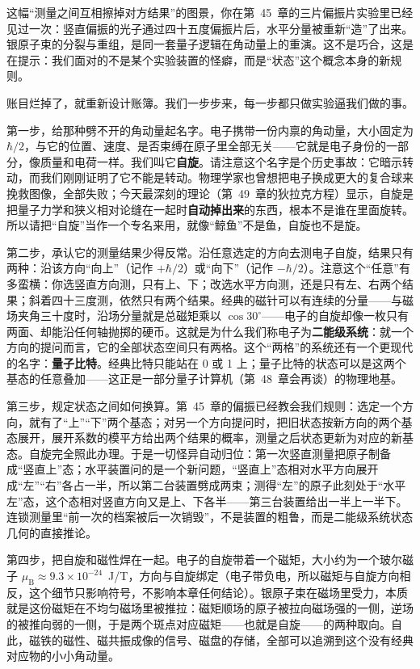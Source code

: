 这幅“测量之间互相擦掉对方结果”的图景，你在第~45~章的三片偏振片实验里已经见过一次：竖直偏振的光子通过四十五度偏振片后，水平分量被重新“造”了出来。银原子束的分裂与重组，是同一套量子逻辑在角动量上的重演。这不是巧合，这是在提示：我们面对的不是某个实验装置的怪癖，而是“状态”这个概念本身的新规则。


账目烂掉了，就重新设计账簿。我们一步步来，每一步都只做实验逼我们做的事。

第一步，给那种劈不开的角动量起名字。电子携带一份内禀的角动量，大小固定为 $\hbar/2$，与它的位置、速度、是否束缚在原子里全部无关——它就是电子身份的一部分，像质量和电荷一样。我们叫它\textbf{自旋}。请注意这个名字是个历史事故：它暗示转动，而我们刚刚证明了它不能是转动。物理学家也曾想把电子换成更大的复合球来挽救图像，全部失败；今天最深刻的理论（第~49~章的狄拉克方程）显示，自旋是把量子力学和狭义相对论缝在一起时\textbf{自动掉出来}的东西，根本不是谁在里面旋转。所以请把“自旋”当作一个专名来用，就像“鲸鱼”不是鱼，自旋也不是旋。

第二步，承认它的测量结果少得反常。沿任意选定的方向去测电子自旋，结果只有两种：沿该方向“向上”（记作 $+\hbar/2$）或“向下”（记作 $-\hbar/2$）。注意这个“任意”有多蛮横：你选竖直方向测，只有上、下；改选水平方向测，还是只有左、右两个结果；斜着四十三度测，依然只有两个结果。经典的磁针可以有连续的分量——与磁场夹角三十度时，沿场分量就是总磁矩乘以 $\cos30^\circ$——电子的自旋却像一枚只有两面、却能沿任何轴抛掷的硬币。这就是为什么我们称电子为\textbf{二能级系统}：就一个方向的提问而言，它的全部状态空间只有两格。这个“两格”的系统还有一个更现代的名字：\textbf{量子比特}。经典比特只能站在 0 或 1 上；量子比特的状态可以是这两个基态的任意叠加——这正是一部分量子计算机（第~48~章会再谈）的物理地基。

第三步，规定状态之间如何换算。第~45~章的偏振已经教会我们规则：选定一个方向，就有了“上”“下”两个基态；对另一个方向提问时，把旧状态按新方向的两个基态展开，展开系数的模平方给出两个结果的概率，测量之后状态更新为对应的新基态。自旋完全照此办理。于是一切怪异自动归位：第一次竖直测量把原子制备成“竖直上”态；水平装置问的是一个新问题，“竖直上”态相对水平方向展开成“左”“右”各占一半，所以第二台装置劈成两束；测得“左”的原子此刻处于“水平左”态，这个态相对竖直方向又是上、下各半——第三台装置给出一半上一半下。连锁测量里“前一次的档案被后一次销毁”，不是装置的粗鲁，而是二能级系统状态几何的直接推论。

第四步，把自旋和磁性焊在一起。电子的自旋带着一个磁矩，大小约为一个玻尔磁子 $\mu_{\mathrm B}\approx9.3\times10^{-24}$~J/T，方向与自旋绑定（电子带负电，所以磁矩与自旋方向相反，这个细节只影响符号，不影响本章任何结论）。银原子束在磁场里受力，本质就是这份磁矩在不均匀磁场里被推拉：磁矩顺场的原子被拉向磁场强的一侧，逆场的被推向弱的一侧，于是两个斑点对应磁矩——也就是自旋——的两种取向。自此，磁铁的磁性、磁共振成像的信号、磁盘的存储，全部可以追溯到这个没有经典对应物的小小角动量。

